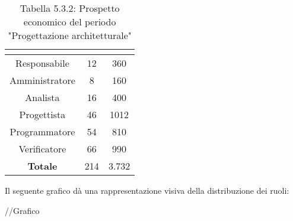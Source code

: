 \renewcommand{\arraystretch}{1.5}
\begin{table}[H]
\begin{center}
\begin{tabular}{|c|c|c|}
\hline
\rowcolor{title_row}
\textbf{\color{title_text}{Ruolo}}  & \textbf{\color{title_text}{Ore}} & \textbf{\color{title_text}{Costo in \euro}} \\ \hline
Responsabile    & 12              & 360                     \\ \hline
Amministratore  & 8              & 160                    \\ \hline
Analista        & 16              & 400                    \\ \hline
Progettista     & 46              & 1012                     \\ \hline
Programmatore   & 54              & 810                     \\ \hline
Verificatore    & 66              & 990                    \\ \hline
\textbf{Totale} & 214 \textbf{}    & 3.732\textbf{}           \\ \hline
\end{tabular}
\caption{Tabella 5.3.2: Prospetto economico del periodo "Progettazione architetturale"\label{}}
\end{center}
\end{table}
\renewcommand{\arraystretch}{1}

Il seguente grafico dà una rappresentazione visiva della distribuzione dei ruoli: \\
\begin{center}
//Grafico
\end{center}

\pagebreak